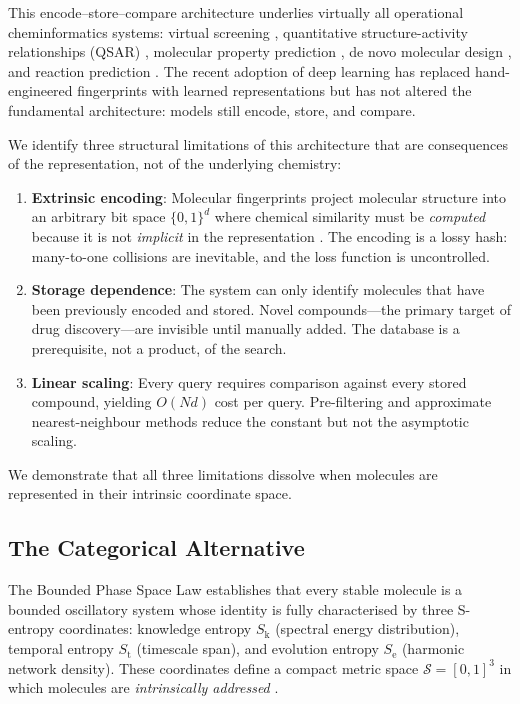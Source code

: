 \documentclass[11pt,twocolumn,a4paper]{article}
\theoremstyle{definition}
\theoremstyle{remark}
\newcommand{\Sk}{S_{\mathrm{k}}}
\newcommand{\St}{S_{\mathrm{t}}}
\newcommand{\Se}{S_{\mathrm{e}}}
\newcommand{\Sspace}{\mathcal{S}}
\begin{document}
This encode--store--compare architecture underlies virtually all operational cheminformatics systems: virtual screening \citep{shoichet2004}, quantitative structure-activity relationships (QSAR) \citep{cherkasov2014}, molecular property prediction \citep{gilmer2017}, de novo molecular design \citep{elton2019}, and reaction prediction \citep{schwaller2019}. The recent adoption of deep learning has replaced hand-engineered fingerprints with learned representations \citep{duvenaud2015, yang2019} but has not altered the fundamental architecture: models still encode, store, and compare.

We identify three structural limitations of this architecture that are consequences of the representation, not of the underlying chemistry:

\begin{enumerate}[nosep]
\item \textbf{Extrinsic encoding}: Molecular fingerprints project molecular structure into an arbitrary bit space $\{0,1\}^d$ where chemical similarity must be \emph{computed} because it is not \emph{implicit} in the representation \citep{riniker2013}. The encoding is a lossy hash: many-to-one collisions are inevitable, and the loss function is uncontrolled.

\item \textbf{Storage dependence}: The system can only identify molecules that have been previously encoded and stored. Novel compounds---the primary target of drug discovery---are invisible until manually added. The database is a prerequisite, not a product, of the search.

\item \textbf{Linear scaling}: Every query requires comparison against every stored compound, yielding $O(Nd)$ cost per query. Pre-filtering and approximate nearest-neighbour methods \citep{johnson2019} reduce the constant but not the asymptotic scaling.
\end{enumerate}

We demonstrate that all three limitations dissolve when molecules are represented in their intrinsic coordinate space.

\subsection{The Categorical Alternative}

The Bounded Phase Space Law \citep{sachikonye2025a} establishes that every stable molecule is a bounded oscillatory system whose identity is fully characterised by three S-entropy coordinates: knowledge entropy $\Sk$ (spectral energy distribution), temporal entropy $\St$ (timescale span), and evolution entropy $\Se$ (harmonic network density). These coordinates define a compact metric space $\Sspace = [0,1]^3$ in which molecules are \emph{intrinsically addressed} \citep{sachikonye2025c}.
\end{document}
